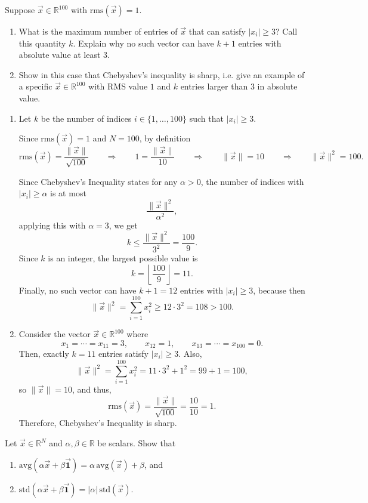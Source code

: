 \documentclass[10pt]{extarticle}
\begin{document}
\begin{problem}
[Problem 5]
Suppose $\vec{x}\in\mathbb{R}^{100}$ with $\mathrm{rms}(\vec{x})=1$.
\begin{enumerate}[label=(\alph*)]
\item What is the maximum number of entries of $\vec{x}$ that can satisfy $|x_i|\ge 3$? Call this quantity $k$. Explain why no such vector can have $k+1$ entries with absolute value at least $3$.
\item Show in this case that Chebyshev's inequality is sharp, i.e. give an example of a specific $\vec{x}\in\mathbb{R}^{100}$ with RMS value $1$ and $k$ entries larger than $3$ in absolute value.
\end{enumerate}
\end{problem}

\begin{enumerate}[label=(\alph*)]
\item Let $k$ be the number of indices $i\in\{1,\dots,100\}$ such that $|x_i|\ge 3$.

Since $\mathrm{rms}(\vec{x})=1$ and $N=100$, by definition
\[
\mathrm{rms}(\vec{x})=\frac{\|\vec{x}\|}{\sqrt{100}}
\qquad\Rightarrow\qquad
1=\frac{\|\vec{x}\|}{10}
\qquad\Rightarrow\qquad
\|\vec{x}\|=10
\qquad\Rightarrow\qquad
\|\vec{x}\|^2=100.
\]

Since Chebyshev's Inequality states for any $\alpha>0$, the number of indices with $|x_i|\ge \alpha$ is at most
\[
\frac{\|\vec{x}\|^2}{\alpha^2},
\]
applying this with $\alpha=3$, we get
\[
k \le \frac{\|\vec{x}\|^2}{3^2}=\frac{100}{9}.
\]
Since $k$ is an integer, the largest possible value is
\[
k=\left\lfloor \frac{100}{9}\right\rfloor=11.
\]
Finally, no such vector can have $k+1=12$ entries with $|x_i|\ge 3$, because then
\[
\|\vec{x}\|^2=\sum_{i=1}^{100}x_i^2 \ge 12\cdot 3^2=108>100.
\]
\item Consider the vector $\vec{x}\in\mathbb{R}^{100}$ where
\[
x_1=\cdots=x_{11}=3,\qquad x_{12}=1,\qquad x_{13}=\cdots=x_{100}=0.
\]
Then, exactly $k=11$ entries satisfy $|x_i|\ge 3$. Also,
\[
\|\vec{x}\|^2=\sum_{i=1}^{100}x_i^2=11\cdot 3^2+1^2=99+1=100,
\]
so $\|\vec{x}\|=10$, and thus,
\[
\mathrm{rms}(\vec{x})=\frac{\|\vec{x}\|}{\sqrt{100}}=\frac{10}{10}=1.
\]
Therefore, Chebyshev's Inequality is sharp.
\end{enumerate}

\begin{problem}
[Problem 6]
Let $\vec{x}\in\mathbb{R}^N$ and $\alpha,\beta\in\mathbb{R}$ be scalars. Show that
\begin{enumerate}[label=(\alph*)]
\item $\mathrm{avg}(\alpha\vec{x}+\beta\vec{\mathbf{1}})=\alpha\,\mathrm{avg}(\vec{x})+\beta$, and
\item $\mathrm{std}(\alpha\vec{x}+\beta\vec{\mathbf{1}})=|\alpha|\,\mathrm{std}(\vec{x})$.
\end{enumerate}
\end{problem}
\end{document}
